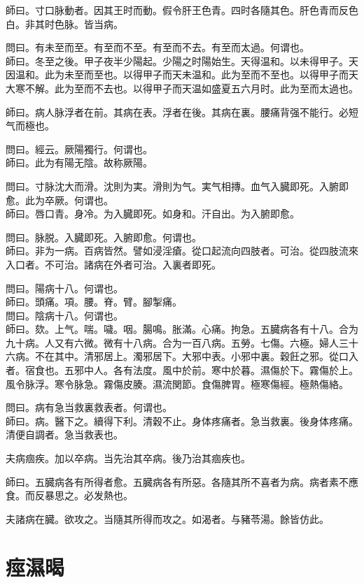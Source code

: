 師曰。寸口脉動者。因其王时而動。假令肝王色青。四时各隨其色。肝色青而反色白。非其时色脉。皆当病。

問曰。有未至而至。有至而不至。有至而不去。有至而太過。何谓也。\\
師曰。冬至之後。甲子夜半少陽起。少陽之时陽始生。天得温和。以未得甲子。天因温和。此为未至而至也。以得甲子而天未温和。此为至而不至也。以得甲子而天大寒不解。此为至而不去也。以得甲子而天温如盛夏五六月时。此为至而太過也。

師曰。病人脉浮者在前。其病在表。浮者在後。其病在裏。腰痛背强不能行。必短气而極也。

問曰。經云。厥陽獨行。何谓也。\\
師曰。此为有陽无陰。故称厥陽。

問曰。寸脉沈大而滑。沈則为実。滑則为气。実气相摶。血气入臓即死。入腑即愈。此为卒厥。何谓也。\\
師曰。唇口青。身冷。为入臓即死。如身和。汗自出。为入腑即愈。

問曰。脉脱。入臓即死。入腑即愈。何谓也。\\
師曰。非为一病。百病皆然。譬如浸淫瘡。從口起流向四肢者。可治。從四肢流來入口者。不可治。{\khaaitp 諸}病在外者可治。入裏者即死。

問曰。陽病十八。何谓也。\\
師曰。頭痛。項。腰。脊。臂。腳掣痛。\\
問曰。陰病十八。何谓也。\\
師曰。欬。上气。喘。噦。咽。腸鳴。胀滿。心痛。拘急。五臓病各有十八。合为九十病。人又有六微。微有十八病。合为一百八病。五勞。七傷。六極。婦人三十六病。不在其中。清邪居上。濁邪居下。大邪中表。小邪中裏。穀飪之邪。從口入者。宿食也。五邪中人。各有法度。風中於前。寒中於暮。濕傷於下。霧傷於上。風令脉浮。寒令脉急。霧傷皮腠。濕流関節。食傷脾胃。極寒傷經。極熱傷絡。

問曰。病有急当救裏救表者。何谓也。\\
師曰。病。醫下之。續得下利。清穀不止。身体疼痛者。急当救裏。後身体疼痛。清便自調者。急当救表也。

夫病痼疾。加以卒病。当先治其卒病。後乃治其痼疾也。

師曰。五臓病各有所得者愈。五臓病各有所惡。各隨其所不喜者为病。病者素不應食。而反暴思之。必发熱也。

夫諸病在臓。欲攻之。当隨其所得而攻之。如渴者。与豬苓湯。餘皆仿此。

\chapter{痙濕暍}

